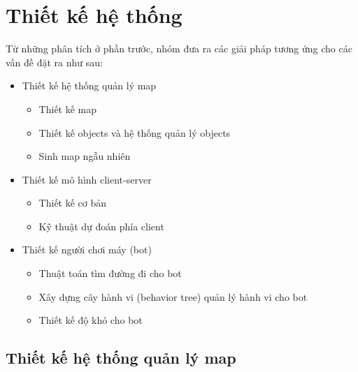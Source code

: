\documentclass[12pt,a4paper]{article}
\begin{document}
  \section{Thiết kế hệ thống}
  Từ những phân tích ở phần trước, nhóm đưa ra các giải pháp tương ứng cho các vấn đề đặt ra như sau:
  \begin{itemize}
      \item Thiết kế hệ thống quản lý map
      \begin{itemize}
          \item Thiết kế map
          \item Thiết kế objects và hệ thống quản lý objects
          \item Sinh map ngẫu nhiên
      \end{itemize}
      \item Thiết kế mô hình client-server
      \begin{itemize}
          \item Thiết kế cơ bản
          \item Kỹ thuật dự đoán phía client
      \end{itemize}
      \item Thiết kế người chơi máy (bot)
      \begin{itemize}
          \item Thuật toán tìm đường đi cho bot
          \item Xây dựng cây hành vi (behavior tree) quản lý hành vi cho bot
          \item Thiết kế độ khó cho bot
      \end{itemize}
  \end{itemize}
  \subsection{Thiết kế hệ thống quản lý map}
\end{document}
